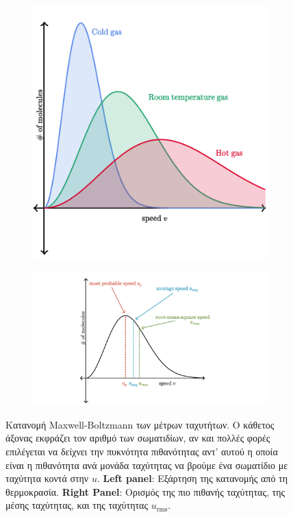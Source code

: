 \begin{figure}[h]
   \centering
\begin{subfigure}[h]{0.45\textwidth}
	\centering
   	 \includegraphics[width = \linewidth]{Figures/MBD_temperatures.png} 
\end{subfigure}
\begin{subfigure}[h]{0.54\textwidth}
	\centering
	\includegraphics[scale=0.6]{Figures/MBD_velocities.png} 
    \end{subfigure}
    \caption{Κατανομή Maxwell-Boltzmann των μέτρων ταχυτήτων. Ο κάθετος άξονας εκφράζει τον αριθμό των σωματιδίων, αν και πολλές φορές επιλέγεται να δείχνει την πυκνότητα πιθανότητας αντ' αυτού η οποία είναι η πιθανότητα ανά μονάδα ταχύτητας να βρούμε ένα σωματίδιο με ταχύτητα κοντά στην $u$. \textbf{Left panel}: Εξάρτηση της κατανομής από τη θερμοκρασία. \textbf{Right Panel}: Ορισμός της πιο πιθανής ταχύτητας, της μέσης ταχύτητας, και της ταχύτητας $u_{\text{rms}}$.}
    \label{fig:MBD_distribution}
\end{figure}

